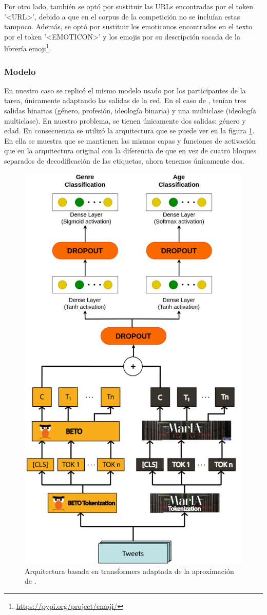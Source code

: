 Por otro lado, también se optó por sustituir las URLs encontradas por el token '<URL>', debido a que en el corpus de la competición no se incluían estas tampoco. Además, se optó por sustituir los emoticonos encontrados en el texto por el token '<EMOTICON>' y los emojis por su descripción sacada de la librería emoji\footnote{\url{https://pypi.org/project/emoji/}}.

\subsubsection{Modelo}
En nuestro caso se replicó el mismo modelo usado por los participantes de la tarea, únicamente adaptando las salidas de la red. En el caso de \citet{loscalis22}, tenían tres salidas binarias (género, profesión, ideología binaria) y una multiclase (ideología multiclase). En nuestro problema, se tienen únicamente dos salidas: género y edad. En consecuencia se utilizó la arquitectura que se puede ver en la figura \ref{fig:arquitectura_adaptada}. En ella se muestra que se mantienen las mismas capas y funciones de activación que en la arquitectura original con la diferencia de que en vez de cuatro bloques separados de decodificación de las etiquetas, ahora tenemos únicamente dos.

\noindent\begin{figure}[H]
  \centering
    \includegraphics[height=0.8\textwidth]{imaxes/diagrama_arquitectura_profiler.png}
  \caption{Arquitectura basada en transformers adaptada de la aproximación de \citet{loscalis22}.}
  \label{fig:arquitectura_adaptada}
\end{figure}

